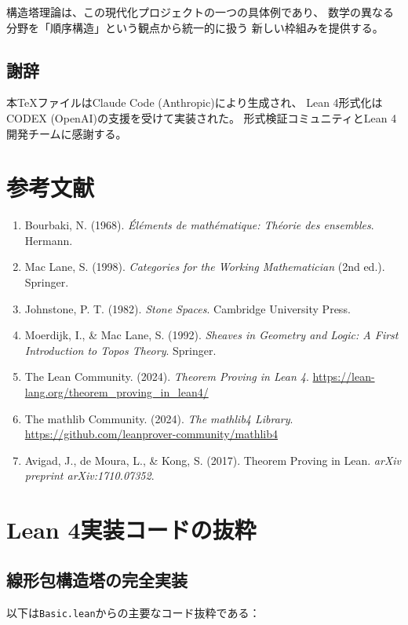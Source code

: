 \documentclass[a4paper,12pt]{ltjsarticle}
\theoremstyle{definition}
\begin{document}
構造塔理論は、この現代化プロジェクトの一つの具体例であり、
数学の異なる分野を「順序構造」という観点から統一的に扱う
新しい枠組みを提供する。

\subsection{謝辞}

本TeXファイルはClaude Code (Anthropic)により生成され、
Lean 4形式化はCODEX (OpenAI)の支援を受けて実装された。
形式検証コミュニティとLean 4開発チームに感謝する。

\section*{参考文献}

\begin{enumerate}
\item Bourbaki, N. (1968). \textit{\'El\'ements de math\'ematique: Th\'eorie des ensembles}. Hermann.
\item Mac Lane, S. (1998). \textit{Categories for the Working Mathematician} (2nd ed.). Springer.
\item Johnstone, P. T. (1982). \textit{Stone Spaces}. Cambridge University Press.
\item Moerdijk, I., \& Mac Lane, S. (1992). \textit{Sheaves in Geometry and Logic: A First Introduction to Topos Theory}. Springer.
\item The Lean Community. (2024). \textit{Theorem Proving in Lean 4}. \url{https://lean-lang.org/theorem_proving_in_lean4/}
\item The mathlib Community. (2024). \textit{The mathlib4 Library}. \url{https://github.com/leanprover-community/mathlib4}
\item Avigad, J., de Moura, L., \& Kong, S. (2017). Theorem Proving in Lean. \textit{arXiv preprint arXiv:1710.07352}.
\end{enumerate}

\appendix

\section{Lean 4実装コードの抜粋}

\subsection{線形包構造塔の完全実装}

以下は\texttt{Basic.lean}からの主要なコード抜粋である：
\end{document}
